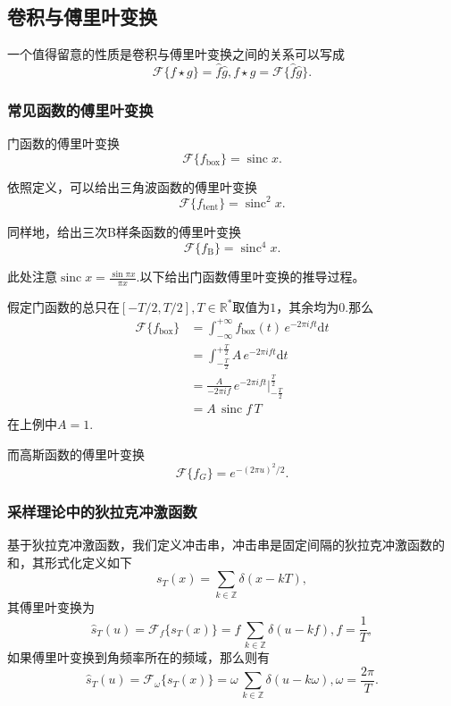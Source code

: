 \documentclass{ctexart}
\begin{document}
	\subsection{卷积与傅里叶变换}
	一个值得留意的性质是卷积与傅里叶变换之间的关系可以写成
	\[\mathcal F\{f\star g\}=\hat f\hat g,f\star g=\mathcal F\{\hat f\hat g\}.\]

	\subsubsection{常见函数的傅里叶变换}
	门函数的傅里叶变换
	\[\mathcal F\{f_{\text{box}}\}=\operatorname{sinc}x.\]

	依照定义，可以给出三角波函数的傅里叶变换
	\[\mathcal F\{f_{\text{tent}}\}=\operatorname{sinc}^2x.\]

	同样地，给出三次B样条函数的傅里叶变换
	\[ \mathcal F\{ f_{\text{B}} \}=\operatorname{sinc}^4x. \]

	此处注意$\operatorname{sinc}x=\frac{\sin \pi x}{\pi x}$.以下给出门函数傅里叶变换的推导过程。

	假定门函数的总只在$[-T/2,T/2],T\in\mathbb{R}^*$取值为$1$，其余均为$0$.那么
	\[
		\begin{aligned}
			\mathcal F \{f_{\text{box}}\}
			&=\int_{-\infty}^{+\infty} f_{\text{box}}(t)\,e^{-2\pi ift}\mathrm dt \\
			&=\int_{-\frac T2}^{+\frac T2} A\,e^{-2\pi ift}\mathrm dt \\
			&=\frac A{-2\pi if}\,e^{-2\pi ift}\Big|^{\frac T2}_{-\frac T2} \\
			&=A\,\operatorname{sinc}{f\,T}
		\end{aligned}
	\]
	在上例中$A=1$.

	而高斯函数的傅里叶变换
	\[ \mathcal F\{f_G\}=e^{-(2\pi u)^2/2}. \]

	\subsubsection{采样理论中的狄拉克冲激函数}
	基于狄拉克冲激函数，我们定义冲击串，冲击串是固定间隔的狄拉克冲激函数的和，其形式化定义如下
	\[ s_T(x)=\sum_{k\in\mathbb Z}\delta(x-kT), \]
	其傅里叶变换为
	\[ \hat s_T(u)=\mathcal F_f \{s_T(x)\}=f\,\sum_{k\in\mathbb Z}\delta(u-kf),f=\frac1T, \]
	如果傅里叶变换到角频率所在的频域，那么则有
	\[ \hat s_T(u)=\mathcal F_\omega \{s_T(x)\}=\omega\,\sum_{k\in\mathbb Z}\delta(u-k\omega),\omega=\frac{2\pi}T. \]
\end{document}
